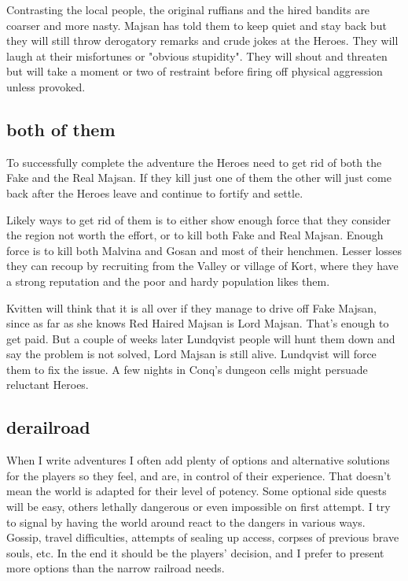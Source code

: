 Contrasting the local people, the original ruffians and the hired bandits are coarser and more nasty. Majsan has told them to keep quiet and stay back but they will still throw derogatory remarks and crude jokes at the Heroes. They will laugh at their misfortunes or "obvious stupidity". They will shout and threaten but will take a moment or two of restraint before firing off physical aggression unless provoked.


\subsection*{both of them}
To successfully complete the adventure the Heroes need to get rid of both the Fake and the Real Majsan. If they kill just one of them the other will just come back after the Heroes leave and continue to fortify and settle.

Likely ways to get rid of them is to either show enough force that they consider the region not worth the effort, or to kill both Fake and Real Majsan. Enough force is to kill both Malvina and Gosan and most of their henchmen. Lesser losses they can recoup by recruiting from the Valley or village of Kort, where they have a strong reputation and the poor and hardy population likes them.

Kvitten will think that it is all over if they manage to drive off Fake Majsan, since as far as she knows Red Haired Majsan is Lord Majsan. That's enough to get paid. But a couple of weeks later Lundqvist people will hunt them down and say the problem is not solved, Lord Majsan is still alive. Lundqvist will force them to fix the issue. A few nights in Conq's dungeon cells might persuade reluctant Heroes.


\subsection*{derailroad}
When I write adventures I often add plenty of options and alternative solutions for the players so they feel, and are, in control of their experience. That doesn't mean the world is adapted for their level of potency. Some optional side quests will be easy, others lethally dangerous or even impossible on first attempt. I try to signal by having the world around react to the dangers in various ways. Gossip, travel difficulties, attempts of sealing up access, corpses of previous brave souls, etc. In the end it should be the players' decision, and I prefer to present more options than the narrow railroad needs.

